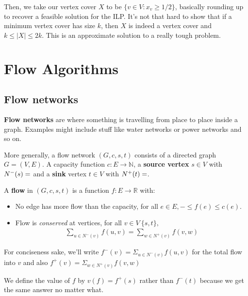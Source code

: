\documentclass[11pt,a4paper,titlepage,dvipsnames,cmyk]{scrartcl}
\begin{document}
Then, we take our vertex cover $X$ to be $\{v \in V : x_v \ge 1/2\}$,
basically rounding up to recover a feasible solution for the ILP. It's not
that hard to show that if a minimum vertex cover has size $k$, then $X$ is
indeed a vertex cover and $k \le |X| \le 2k$. This is an approximate
solution to a really tough problem.

\section{Flow Algorithms}%
\label{sec:flow-algorithms}
\subsection{Flow networks}%
\label{sub:flow-networks}
\textbf{Flow networks} are where something is travelling from place to
place inside a graph. Examples might include stuff like water networks or
power networks and so on.

More generally, a flow network $(G,c,s,t)$ consists of a directed graph $G
= (V,E)$. A capacity function $c : E \rightarrow \mathbb{N}$, a
\textbf{source vertex} $s \in V$ with $N^- (s) = \empty$ and a
\textbf{sink} vertex $t \in V$ with $N^+(t) = \empty$.

A \textbf{flow} in $(G,c,s,t)$ is a function $f:E \rightarrow \mathbb{R}$
with:
\begin{itemize}
    \item No edge has more flow than the capacity, for all $e \in E, - \le
        f(e) \le c(e)$.
    \item Flow is \textit{conserved} at vertices, for all $v \in V \
        \{s,t\},$
        \begin{align*}
            \sum_{u\in N^-(v)} f(u,v) = \sum_{w\in N^+(v)} f(v,w)
        \end{align*}
\end{itemize}

For conciseness sake, we'll write $f^- (v) = \Sigma_{u\in N^- (v)} f(u,v)$
for the total flow into $v$ and also $f^+ (v) = \Sigma_{w\in N^+(v)}
f(v,w)$

We define the value of $f$ by $v(f) = f^+(s)$ rather than $f^-(t)$ because
we get the same answer no matter what.
\end{document}
